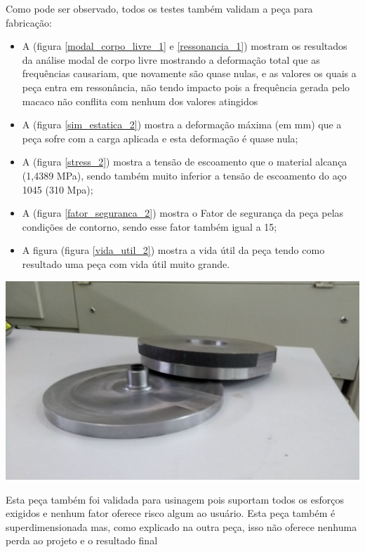     Como pode ser observado, todos os testes também validam a peça para fabricação:
    \begin{itemize}
        \item A (figura \ref{modal_corpo_livre_1} e  \ref{ressonancia_1}) mostram os resultados da análise modal de corpo livre mostrando a deformação total que as frequências causariam, que novamente são quase nulas, e as valores os quais a peça entra em ressonância, não tendo impacto pois a frequência gerada pelo macaco não conflita com nenhum dos valores atingidos
        \item A (figura \ref{sim_estatica_2}) mostra a deformação máxima (em mm) que a peça sofre com a carga aplicada e esta deformação é quase nula;
        \item A (figura \ref{stress_2}) mostra a tensão de escoamento que o material alcança (1,4389 MPa), sendo também muito inferior a tensão de escoamento do aço 1045 (310 Mpa);
        \item A (figura \ref{fator_seguranca_2}) mostra o Fator de segurança da peça pelas condições de contorno, sendo esse fator também igual a 15;
        \item A figura (figura \ref{vida_util_2}) mostra a vida útil da peça tendo como resultado uma peça com vida útil muito grande.
    \end{itemize}

    \begin{center}
    	\includegraphics[scale=0.4]{figuras/mesa_giratoria_1}
        \label{mesa_giratoria_1}
    \end{center}

    Esta peça também foi validada para usinagem pois suportam todos os esforços exigidos e nenhum fator oferece risco algum ao usuário. Esta peça também é superdimensionada mas, como explicado na outra peça, isso não oferece nenhuma perda ao projeto e o resultado final

